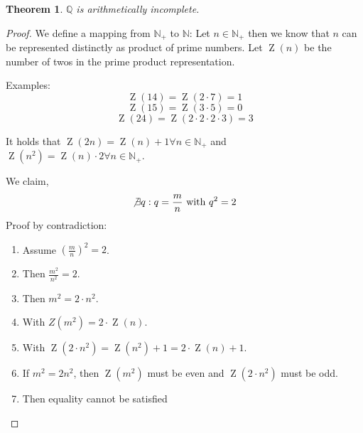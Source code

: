 \documentclass[a4paper,landscape,twocolumn]{article}
\newtheorem{theorem}{Theorem}
\begin{document}
\begin{theorem}
  $\mathbb Q$ is arithmetically incomplete.
\end{theorem}

\begin{proof}
  We define a mapping from $\mathbb N_+$ to $\mathbb N$:
  Let $n \in \mathbb N_+$ then we know that $n$ can be represented distinctly
  as product of prime numbers. Let $\operatorname{Z}(n)$ be the number of twos
  in the prime product representation.

  Examples:
  \[ \operatorname{Z}(14) = \operatorname{Z}(2 \cdot 7) = 1 \]
  \[ \operatorname{Z}(15) = \operatorname{Z}(3 \cdot 5) = 0 \]
  \[ \operatorname{Z}(24) = \operatorname{Z}(2 \cdot 2 \cdot 2 \cdot 3) = 3 \]

  It holds that $\operatorname{Z}(2n) = \operatorname{Z}(n) + 1 \forall n \in \mathbb N_+$
  and $\operatorname{Z}(n^2) = \operatorname{Z}(n) \cdot 2 \forall n \in \mathbb N_+$.

  We claim,
  \[ \not\exists q: q = \frac mn \text{ with } q^2 = 2 \]
  Proof by contradiction:
  \begin{enumerate}
    \item Assume $\left(\frac mn\right)^2 = 2$.
    \item Then $\frac{m^2}{n^2} = 2$.
    \item Then $m^2 = 2 \cdot n^2$.
    \item With $Z(m^2) = 2\cdot \operatorname{Z}(n)$.
    \item With $\operatorname{Z}(2\cdot n^2) = \operatorname{Z}(n^2) + 1 = 2 \cdot \operatorname{Z}(n) + 1$.
    \item If $m^2 = 2n^2$, then $\operatorname{Z}(m^2)$ must be even and $\operatorname{Z}(2\cdot n^2)$ must be odd.
    \item Then equality cannot be satisfied \lightning
  \end{enumerate}
\end{proof}
\end{document}
